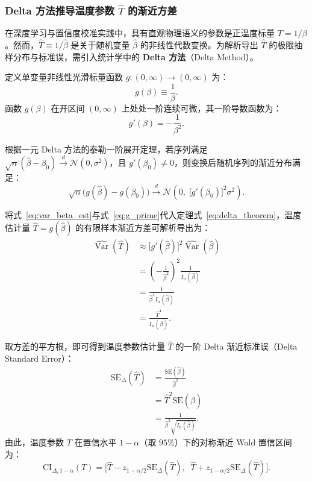 \subsubsection{Delta 方法推导温度参数 $\hat T$ 的渐近方差}

在深度学习与置信度校准实践中，具有直观物理语义的参数是正温度标量 $T = 1/\beta$。然而，$\hat T \equiv 1/\hat\beta$ 是关于随机变量 $\hat\beta$ 的非线性代数变换。为解析导出 $\hat T$ 的极限抽样分布与标准误，需引入统计学中的 \textbf{Delta 方法}（Delta Method）。

定义单变量非线性光滑标量函数 $g: (0, \infty) \to (0, \infty)$ 为：
\begin{equation}\label{eq:g_transform}
g(\beta) \equiv \frac{1}{\beta}.
\end{equation}
函数 $g(\beta)$ 在开区间 $(0, \infty)$ 上处处一阶连续可微，其一阶导数函数为：
\begin{equation}\label{eq:g_prime}
g'(\beta) = - \frac{1}{\beta^2}.
\end{equation}

根据一元 Delta 方法的泰勒一阶展开定理，若序列满足 $\sqrt{n}(\hat\beta - \beta_0) \xrightarrow{d} \mathcal{N}(0, \sigma^2)$，且 $g'(\beta_0) \ne 0$，则变换后随机序列的渐近分布满足：
\begin{equation}\label{eq:delta_theorem}
\sqrt{n}\Big(g(\hat\beta) - g(\beta_0)\Big) \xrightarrow{d} \mathcal{N}\left(0, \;\big[g'(\beta_0)\big]^2 \sigma^2\right).
\end{equation}

将式~\eqref{eq:var_beta_est}与式~\eqref{eq:g_prime}代入定理式~\eqref{eq:delta_theorem}，温度估计量 $\hat T = g(\hat\beta)$ 的有限样本渐近方差可解析导出为：
\begin{align}
\widehat{\operatorname{Var}}(\hat T) &\approx \big[g'(\hat\beta)\big]^2 \widehat{\operatorname{Var}}(\hat\beta) \nonumber\\
&= \left( - \frac{1}{\hat\beta^2} \right)^2 \frac{1}{I_n(\hat\beta)} \nonumber\\
&= \frac{1}{\hat\beta^4 I_n(\hat\beta)} \nonumber\\
&= \frac{\hat T^4}{I_n(\hat\beta)}. \label{eq:t_variance_analytic}
\end{align}

取方差的平方根，即可得到温度参数估计量 $\hat T$ 的一阶 Delta 渐近标准误（Delta Standard Error）：
\begin{equation}\label{eq:delta_se_formula}
\begin{split}
\mathrm{SE}_\Delta(\hat T) &= \frac{\mathrm{SE}(\hat\beta)}{\hat\beta^2} \\
&= \hat T^2 \mathrm{SE}(\hat\beta) \\
&= \frac{1}{\hat\beta^2 \sqrt{I_n(\hat\beta)}}.
\end{split}
\end{equation}
由此，温度参数 $T$ 在置信水平 $1-\alpha$（取 $95\%$）下的对称渐近 Wald 置信区间为：
\begin{equation}\label{eq:wald_ci_T}
\mathrm{CI}_{\Delta, 1-\alpha}(T) = \big[ \hat T - z_{1-\alpha/2} \mathrm{SE}_\Delta(\hat T), \;\; \hat T + z_{1-\alpha/2} \mathrm{SE}_\Delta(\hat T) \big].
\end{equation}

